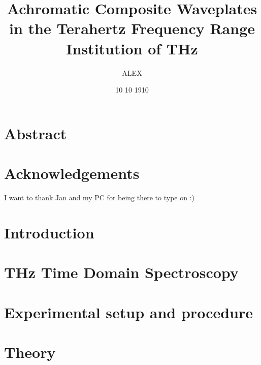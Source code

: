 \documentclass[12pt, a4paper]{report}
\title{
{Achromatic Composite Waveplates in the Terahertz Frequency Range}\\
{\large Institution of THz}\\
}
\author{ALEX}
\date{10 10 1910}
\begin{document}
\maketitle

\chapter*{Abstract}



\chapter*{Acknowledgements}
I want to thank Jan and my PC for being there to type on :)

\tableofcontents %



\chapter{Introduction}

\chapter{THz Time Domain Spectroscopy}

\chapter{Experimental setup and procedure}

\chapter{Theory}
\end{document}
